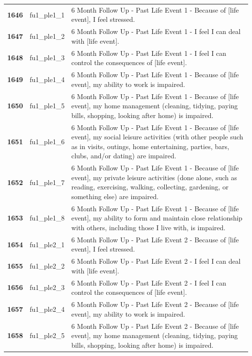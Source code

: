\documentclass[
  letterpaper,
  DIV=11,
  numbers=noendperiod]{scrartcl}
\begin{document}
\begin{longtable}[t]{>{}cll}
\addlinespace
\textbf{1646} & fu1\_ple1\_1 & 6 Month Follow Up - Past Life Event 1 - Because of [life event], I feel stressed.\\
\textbf{1647} & fu1\_ple1\_2 & 6 Month Follow Up - Past Life Event 1 - I feel I can deal with [life event].\\
\textbf{1648} & fu1\_ple1\_3 & 6 Month Follow Up - Past Life Event 1 - I feel I can control the consequences of [life event].\\
\textbf{1649} & fu1\_ple1\_4 & 6 Month Follow Up - Past Life Event 1 - Because of [life event], my ability to work is impaired.\\
\textbf{1650} & fu1\_ple1\_5 & 6 Month Follow Up - Past Life Event 1 - Because of [life event], my home management (cleaning, tidying, paying bills, shopping, looking after home)  is impaired.\\
\addlinespace
\textbf{1651} & fu1\_ple1\_6 & 6 Month Follow Up - Past Life Event 1 - Because of [life event], my social leisure activities (with other people such as in visits, outings, home entertaining, parties, bars, clubs, and/or dating) are impaired.\\
\textbf{1652} & fu1\_ple1\_7 & 6 Month Follow Up - Past Life Event 1 - Because of [life event], my private leisure activities (done alone, such as reading, exercising, walking, collecting, gardening, or something else) are impaired.\\
\textbf{1653} & fu1\_ple1\_8 & 6 Month Follow Up - Past Life Event 1 - Because of [life event], my ability to form and maintain close relationship with others, including those I live with, is impaired.\\
\textbf{1654} & fu1\_ple2\_1 & 6 Month Follow Up - Past Life Event 2 - Because of [life event], I feel stressed.\\
\textbf{1655} & fu1\_ple2\_2 & 6 Month Follow Up - Past Life Event 2 - I feel I can deal with [life event].\\
\addlinespace
\textbf{1656} & fu1\_ple2\_3 & 6 Month Follow Up - Past Life Event 2 - I feel I can control the consequences of [life event].\\
\textbf{1657} & fu1\_ple2\_4 & 6 Month Follow Up - Past Life Event 2 - Because of [life event], my ability to work is impaired.\\
\textbf{1658} & fu1\_ple2\_5 & 6 Month Follow Up - Past Life Event 2 - Because of [life event], my home management (cleaning, tidying, paying bills, shopping, looking after home)  is impaired.\\

\end{longtable}
\end{document}
